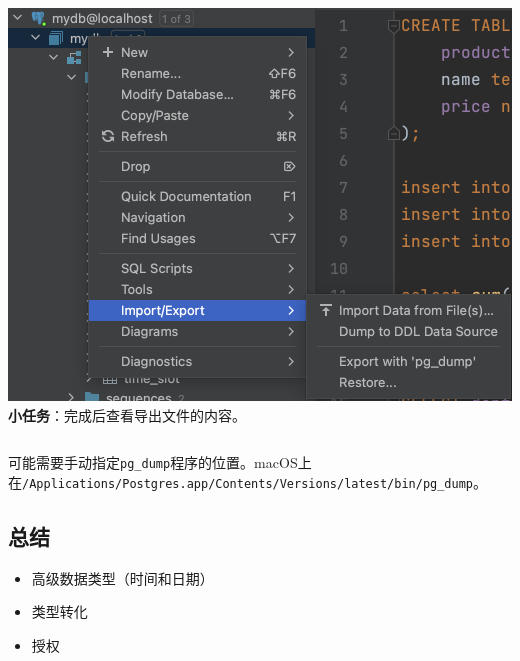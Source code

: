 \documentclass[aspectratio=169, 14pt]{beamer}
\begin{document}
\begin{frame}

    \begin{columns}
        \includegraphics[width=\textwidth]{advanced/dump}
         \textbf{小任务}：完成后查看导出文件的内容。
    \end{columns}
可能需要手动指定\texttt{pg\_dump}程序的位置。macOS上在{\small \texttt{/Applications/Postgres.app/Contents/Versions/latest/bin/pg\_dump}}。
\end{frame}


\begin{frame}[fragile]
    \section{\textcolor{darkmidnightblue}{总结}}

    \begin{itemize}
        \item 高级数据类型（时间和日期）
        \item 类型转化
        \item 授权
    \end{itemize}
\end{frame}
\end{document}

